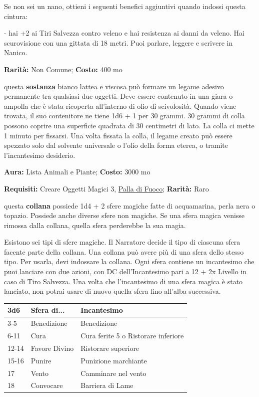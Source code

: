 \begin{multicols}{2}
Se non sei un nano, ottieni i seguenti benefici aggiuntivi quando indossi questa cintura:

- hai +2 ai Tiri Salvezza contro veleno e hai resistenza ai danni da veleno. Hai scurovisione con una gittata di 18 metri. Puoi parlare, leggere e scrivere in Nanico.


\textbf{Rarità:} Non Comune; \textbf{Costo:} 400 mo

questa \textbf{sostanza} bianco lattea e viscosa può formare un legame adesivo permanente tra qualsiasi due oggetti. Deve essere contenuto in una giara o ampolla che è stata ricoperta all'interno di olio di scivolosità. Quando viene trovata, il suo contenitore ne tiene 1d6 + 1 per 30 grammi. 30 grammi di colla possono coprire una superficie quadrata di 30 centimetri di lato. La colla ci mette 1 minuto per fissarsi. Una volta fissata la colla, il legame creato può essere spezzato solo dal solvente universale o l'olio della forma eterea, o tramite l'incantesimo desiderio.


\textbf{Aura:} Lista Animali e Piante; \textbf{Costo:} 3000 mo

\textbf{Requisiti:} Creare Oggetti Magici 3, \hyperlink{Palla di Fuoco}{Palla di Fuoco}; \textbf{Rarità:} Raro

questa \textbf{collana} possiede 1d4 + 2 sfere magiche fatte di acquamarina, perla nera o topazio. Possiede anche diverse sfere non magiche. Se una sfera magica venisse rimossa dalla collana, quella sfera perderebbe la sua magia.

Esistono sei tipi di sfere magiche. Il Narratore decide il tipo di ciascuna sfera facente parte della collana. Una collana può avere più di una sfera dello stesso tipo. Per usarla, devi indossare la collana. Ogni sfera contiene un incantesimo che puoi lanciare con due azioni, con DC dell'Incantesimo pari a 12 + 2x Livello in caso di Tiro Salvezza. Una volta che l'incantesimo di una sfera magica è stato lanciato, non potrai usare di nuovo quella sfera fino all'alba successiva.

\medskip

\noindent\begin{tabularx}{\linewidth}{llX}
	\toprule
\rowcolor{gray!20}\textbf{3d6} &\textbf{Sfera di...} &\textbf{Incantesimo}\\
\toprule
3-5 &Benedizione &Benedizione\\
\rowcolor{gray!20}6-11& Cura &Cura ferite 5 o Ristorare inferiore\\
12-14 &Favore Divino& Ristorare superiore\\
\rowcolor{gray!20}15-16& Punire &Punizione marchiante\\
17 &Vento& Camminare nel vento\\
\rowcolor{gray!20}18 &Convocare &Barriera di Lame
\end{tabularx}


\end{multicols}
